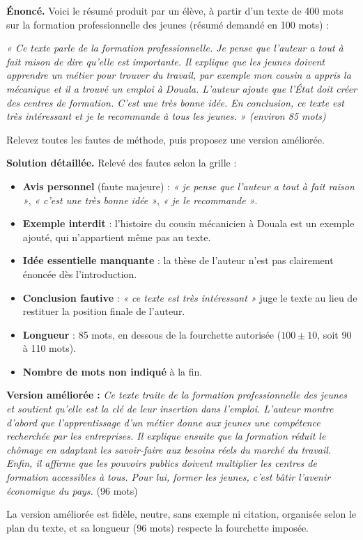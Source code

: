 \documentclass[11pt]{article}
\begin{document}
\begin{exoresolu}
\textbf{Énoncé.} Voici le résumé produit par un élève, à partir d'un texte de 400 mots sur la formation professionnelle des jeunes (résumé demandé en 100 mots) :

\emph{« Ce texte parle de la formation professionnelle. Je pense que l'auteur a tout à fait raison de dire qu'elle est importante. Il explique que les jeunes doivent apprendre un métier pour trouver du travail, par exemple mon cousin a appris la mécanique et il a trouvé un emploi à Douala. L'auteur ajoute que l'État doit créer des centres de formation. C'est une très bonne idée. En conclusion, ce texte est très intéressant et je le recommande à tous les jeunes. » (environ 85 mots)}

Relevez toutes les fautes de méthode, puis proposez une version améliorée.

\tcblower
\textbf{Solution détaillée.} Relevé des fautes selon la grille :
\begin{itemize}
\item \textbf{Avis personnel} (faute majeure) : \emph{« je pense que l'auteur a tout à fait raison »}, \emph{« c'est une très bonne idée »}, \emph{« je le recommande »}.
\item \textbf{Exemple interdit} : l'histoire du cousin mécanicien à Douala est un exemple ajouté, qui n'appartient même pas au texte.
\item \textbf{Idée essentielle manquante} : la thèse de l'auteur n'est pas clairement énoncée dès l'introduction.
\item \textbf{Conclusion fautive} : \emph{« ce texte est très intéressant »} juge le texte au lieu de restituer la position finale de l'auteur.
\item \textbf{Longueur} : 85 mots, en dessous de la fourchette autorisée ($100 \pm 10$, soit 90 à 110 mots).
\item \textbf{Nombre de mots non indiqué} à la fin.
\end{itemize}

\textbf{Version améliorée :} \emph{Ce texte traite de la formation professionnelle des jeunes et soutient qu'elle est la clé de leur insertion dans l'emploi. L'auteur montre d'abord que l'apprentissage d'un métier donne aux jeunes une compétence recherchée par les entreprises. Il explique ensuite que la formation réduit le chômage en adaptant les savoir-faire aux besoins réels du marché du travail. Enfin, il affirme que les pouvoirs publics doivent multiplier les centres de formation accessibles à tous. Pour lui, former les jeunes, c'est bâtir l'avenir économique du pays.} (96 mots)

La version améliorée est fidèle, neutre, sans exemple ni citation, organisée selon le plan du texte, et sa longueur (96 mots) respecte la fourchette imposée.
\end{exoresolu}
\end{document}
